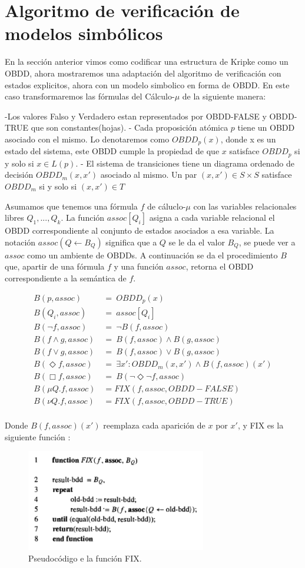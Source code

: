 \section{Algoritmo de verificación de modelos simbólicos}

En la sección anterior vimos como codificar una estructura de Kripke como un OBDD, ahora mostraremos una adaptación del algoritmo de verificación con estados explicitos, ahora con un modelo simbolico en forma de OBDD. En este caso transformaremos las fórmulas del Cálculo-$\mu$ de la siguiente manera\cite{Clarke:1}:

-Los valores Falso y Verdadero estan representados por OBDD-FALSE y OBDD-TRUE que son constantes(hojas).
- Cada proposición atómica $p$ tiene un OBDD asociado con el mismo. Lo denotaremos como $OBDD_{p}(x)$, donde x es un estado del sistema, este OBDD cumple la propiedad de que $x$ satisface $OBDD_{p}$ si y solo si $x \in L(p)$.
- El sistema de transiciones tiene un diagrama ordenado de decisión $OBDD_{m}(x,x')$ asociado al mismo. Un par $(x,x') \in S \times S$ satisface $OBDD_{m}$ si y solo si $(x,x') \in T$

Asumamos que tenemos una fórmula $f$ de cáluclo-$\mu$ con las variables relacionales libres $Q_{1},...,Q_{k}$. La función $assoc[Q_{i}]$ asigna a cada variable relacional el OBDD correspondiente al conjunto de estados asociados a esa variable. La notación $assoc(Q \gets B_{Q})$ significa que a $Q$ se le da el valor $B_{Q}$, se puede ver a $assoc$ como un ambiente de OBDDs. A continuación se da el procedimiento $B$ que, apartir de una fórmula $f$ y una función $assoc$, retorna el OBDD correspondiente a la semántica de $f$.

\begin{align*}
 B(p,assoc)\ &=\ OBDD_{p}(x) \\
 B(Q_{i},assoc)\ &=\ assoc[Q_{i}] \\
 B(\neg f,assoc)\ &=\ \neg B(f,assoc) \\
 B(f \land g,assoc)\ &=\ B(f,assoc) \land B(g,assoc) \\
 B(f \lor g,assoc)\ &=\ B(f,assoc) \lor B(g,assoc) \\
 B(\Diamond f,assoc)\ &=\ \exists x' : OBDD_{m}(x,x') \land B(f,assoc)(x') \\
 B(\Box f,assoc)\ &=\ B(\neg \Diamond \neg f, assoc) \\
 B(\mu Q. f, assoc) &= FIX(f,assoc,OBDD-FALSE) \\
 B(\nu Q. f, assoc) &= FIX(f,assoc,OBDD-TRUE) \\
\end{align*}

Donde $B(f,assoc)(x')$ reemplaza cada aparición de $x$ por $x'$, y FIX es la siguiente función \cite{Clarke:1}:
\begin{figure}[H]
  \centering
  \includegraphics[width=0.7\textwidth]{Figures/fix.png}
  \caption{Pseudocódigo e la función FIX.}
  \label{fig:fix}
\end{figure}